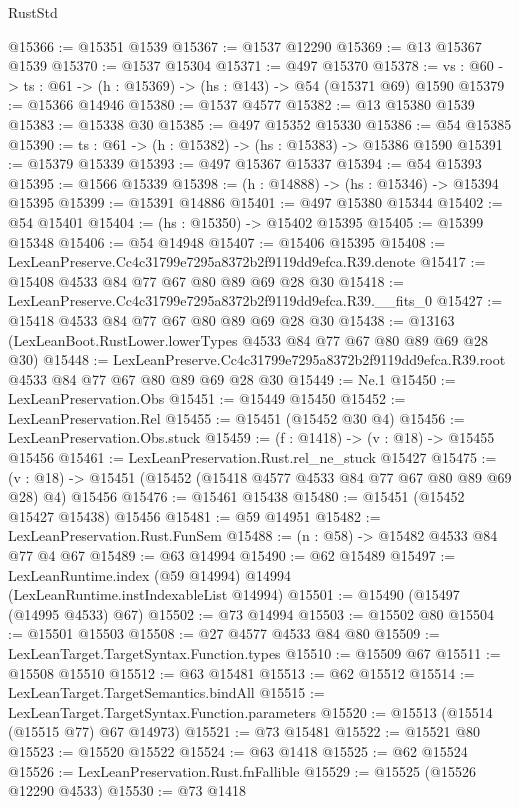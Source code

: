 \begin{lexlean}{RustStd}
\begin{coremodule}
@15366 := @15351 @1539
@15367 := @1537 @12290
@15369 := @13 @15367 @1539
@15370 := @1537 @15304
@15371 := @497 @15370
@15378 := {vs : @60} -> {ts : @61} -> (h : @15369) -> (hs : @143) -> @54 (@15371 @69) @1590
@15379 := @15366 @14946
@15380 := @1537 @4577
@15382 := @13 @15380 @1539
@15383 := @15338 @30
@15385 := @497 @15352 @15330
@15386 := @54 @15385
@15390 := {ts : @61} -> (h : @15382) -> (hs : @15383) -> @15386 @1590
@15391 := @15379 @15339
@15393 := @497 @15367 @15337
@15394 := @54 @15393
@15395 := @1566 @15339
@15398 := (h : @14888) -> (hs : @15346) -> @15394 @15395
@15399 := @15391 @14886
@15401 := @497 @15380 @15344
@15402 := @54 @15401
@15404 := (hs : @15350) -> @15402 @15395
@15405 := @15399 @15348
@15406 := @54 @14948
@15407 := @15406 @15395
@15408 := LexLeanPreserve.Cc4c31799e7295a8372b2f9119dd9efca.R39.denote
@15417 := @15408 @4533 @84 @77 @67 @80 @89 @69 @28 @30
@15418 := LexLeanPreserve.Cc4c31799e7295a8372b2f9119dd9efca.R39.__fits_0
@15427 := @15418 @4533 @84 @77 @67 @80 @89 @69 @28 @30
@15438 := @13163 (LexLeanBoot.RustLower.lowerTypes @4533 @84 @77 @67 @80 @89 @69 @28 @30)
@15448 := LexLeanPreserve.Cc4c31799e7295a8372b2f9119dd9efca.R39.root
    @4533
    @84
    @77
    @67
    @80
    @89
    @69
    @28
    @30
@15449 := Ne.{1}
@15450 := LexLeanPreservation.Obs
@15451 := @15449 @15450
@15452 := LexLeanPreservation.Rel
@15455 := @15451 (@15452 @30 @4)
@15456 := LexLeanPreservation.Obs.stuck
@15459 := (f : @1418) -> (v : @18) -> @15455 @15456
@15461 := LexLeanPreservation.Rust.rel_ne_stuck @15427
@15475 := (v : @18) -> @15451 (@15452 (@15418 @4577 @4533 @84 @77 @67 @80 @89 @69 @28) @4) @15456
@15476 := @15461 @15438
@15480 := @15451 (@15452 @15427 @15438) @15456
@15481 := @59 @14951
@15482 := LexLeanPreservation.Rust.FunSem
@15488 := (n : @58) -> @15482 @4533 @84 @77 @4 @67
@15489 := @63 @14994
@15490 := @62 @15489
@15497 := LexLeanRuntime.index (@59 @14994) @14994 (LexLeanRuntime.instIndexableList @14994)
@15501 := @15490 (@15497 (@14995 @4533) @67)
@15502 := @73 @14994
@15503 := @15502 @80
@15504 := @15501 @15503
@15508 := @27 @4577 @4533 @84 @80
@15509 := LexLeanTarget.TargetSyntax.Function.types
@15510 := @15509 @67
@15511 := @15508 @15510
@15512 := @63 @15481
@15513 := @62 @15512
@15514 := LexLeanTarget.TargetSemantics.bindAll
@15515 := LexLeanTarget.TargetSyntax.Function.parameters
@15520 := @15513 (@15514 (@15515 @77) @67 @14973)
@15521 := @73 @15481
@15522 := @15521 @80
@15523 := @15520 @15522
@15524 := @63 @1418
@15525 := @62 @15524
@15526 := LexLeanPreservation.Rust.fnFallible
@15529 := @15525 (@15526 @12290 @4533)
@15530 := @73 @1418

\end{coremodule}
\end{lexlean}
